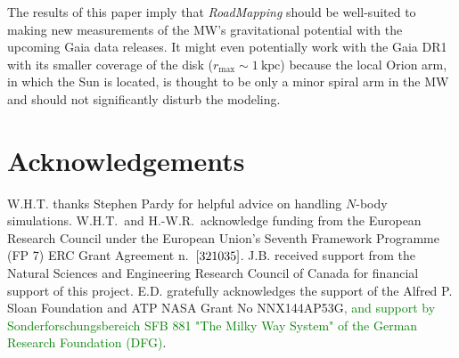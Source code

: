 \documentclass[iop,revtex4,numberedappendix,appendixfloats]{emulateapj}
\newcommand{\RM}{{\sl RoadMapping}}
\newcommand{\NEW}[1]{\textcolor{Green}{#1}}
\newcommand{\OLD}[1]{}
\begin{document}
\OLD{The simulations we analyzed do not have a prominent bar, and so we have not explicitly explored the impact of such a feature. Bars can play an important role in the dynamics when very small volumes near a resonance are considered (e.g. \citealt{2000AJ....119..800D}). When considering volumes of $\gtrsim 1~\text{kpc}$, we have no reason to believe that this should severely affect the robustness of such an analysis.}

The results of this paper imply that \RM{} should be well-suited to making new measurements of the MW's gravitational potential with the upcoming Gaia data releases. It might even potentially work with the Gaia DR1 with its smaller coverage of the disk ($r_\text{max}\sim 1~\text{kpc}$) because the local Orion arm, in which the Sun is located, is thought to be only a minor spiral arm in the MW and should not significantly disturb the modeling. 


\section{Acknowledgements}

W.H.T. thanks Stephen Pardy for helpful advice on handling $N$-body simulations. W.H.T.\ and H.-W.R.~acknowledge funding from the European Research Council under the European Union’s Seventh Framework Programme (FP 7) ERC Grant Agreement n.~${\rm [321035]}$. J.B. received support from the Natural Sciences and Engineering Research Council of Canada for financial support of this project. E.D. gratefully acknowledges the support of the Alfred P. Sloan Foundation and ATP NASA Grant No NNX144AP53G\NEW{, and support by Sonderforschungsbereich SFB 881 "The Milky Way System" of the German Research Foundation (DFG)}. 


{}

\end{document}

